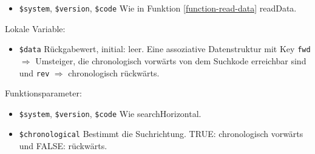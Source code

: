 \begin{itemize}
\item \texttt{\$system}, \texttt{\$version}, \texttt{\$code} \newline 
Wie in Funktion \ref{function-read-data} readData.
\end{itemize}

Lokale Variable:

\begin{itemize}
\item \texttt{\$data} \hspace{2em} Rückgabewert, initial: leer.
\newline Eine assoziative Datenstruktur mit Key \texttt{fwd} $\Rightarrow$ Umsteiger, die chronologisch vorwärts von dem Suchkode erreichbar sind und \texttt{rev} $\Rightarrow$ chronologisch rückwärts. \\
\end{itemize}

{
}




Funktionsparameter:

\begin{itemize}
\item \texttt{\$system}, \texttt{\$version}, \texttt{\$code} \newline Wie searchHorizontal. 
\item \texttt{\$chronological}
\newline Bestimmt die Suchrichtung. TRUE: chronologisch vorwärts und FALSE: rückwärts. 
\end{itemize}

